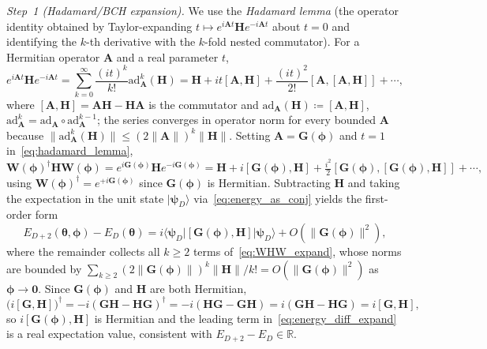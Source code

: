 \documentclass[11pt]{article}
\newcommand{\bbR}{\mathbb{R}}
\theoremstyle{plain}
\theoremstyle{plain}
\begin{document}
\emph{Step~1 (Hadamard/BCH expansion).}
We use the \emph{Hadamard lemma} (the operator identity obtained by
Taylor-expanding $t\mapsto e^{i\mathbf{A}t}\mathbf{H}e^{-i\mathbf{A}t}$ about $t=0$ and
identifying the $k$-th derivative with the $k$-fold nested commutator).
For a Hermitian operator $\mathbf{A}$ and a real parameter $t$,
\begin{equation}\label{eq:hadamard_lemma}
  e^{i\mathbf{A}t} \mathbf{H} e^{-i\mathbf{A}t}
  =\sum_{k=0}^{\infty}\frac{(it)^k}{k!} \mathrm{ad}_{\mathbf{A}}^{k}(\mathbf{H})
  =\mathbf{H}+it[\mathbf{A},\mathbf{H}]+\frac{(it)^2}{2!}[\mathbf{A},[\mathbf{A},\mathbf{H}]]+\cdots,
\end{equation}
where $[\mathbf{A},\mathbf{H}]=\mathbf{A}\mathbf{H}-\mathbf{H}\mathbf{A}$ is the commutator and
$\mathrm{ad}_{\mathbf{A}}(\mathbf{H})\coloneqq[\mathbf{A},\mathbf{H}]$,
$\mathrm{ad}_{\mathbf{A}}^{k}=\mathrm{ad}_{\mathbf{A}}\circ\mathrm{ad}_{\mathbf{A}}^{k-1}$;
the series converges in operator norm for every bounded $\mathbf{A}$ because
$\|\mathrm{ad}_{\mathbf{A}}^{k}(\mathbf{H})\|\le(2\|\mathbf{A}\|)^k\|\mathbf{H}\|$.  Setting
$\mathbf{A}=\mathbf{G}(\bm\phi)$ and $t=1$ in~\eqref{eq:hadamard_lemma},
\begin{equation}\label{eq:WHW_expand}
  \mathbf{W}(\bm\phi)^\dagger\mathbf{H} \mathbf{W}(\bm\phi)
  =e^{i\mathbf{G}(\bm\phi)} \mathbf{H} e^{-i\mathbf{G}(\bm\phi)}
  =\mathbf{H}+i[\mathbf{G}(\bm\phi),\mathbf{H}]
   +\tfrac{i^2}{2}[\mathbf{G}(\bm\phi),[\mathbf{G}(\bm\phi),\mathbf{H}]]+\cdots,
\end{equation}
using $\mathbf{W}(\bm\phi)^\dagger=e^{+i\mathbf{G}(\bm\phi)}$ since $\mathbf{G}(\bm\phi)$ is
Hermitian.  Subtracting $\mathbf{H}$ and taking the expectation in the unit
state $|\boldsymbol{\psi}_D\rangle$ via~\eqref{eq:energy_as_conj} yields the
first-order form
\begin{equation}\label{eq:energy_diff_expand}
  E_{D+2}(\bm\theta,\bm\phi)-E_D(\bm\theta)
  =i\langle\boldsymbol{\psi}_D|[\mathbf{G}(\bm\phi),\mathbf{H}]|\boldsymbol{\psi}_D\rangle
   +O(\|\mathbf{G}(\bm\phi)\|^2),
\end{equation}
where the remainder collects all $k\ge 2$ terms
of~\eqref{eq:WHW_expand}, whose norms are bounded by
$\sum_{k\ge2}(2\|\mathbf{G}(\bm\phi)\|)^k\|\mathbf{H}\|/k!=O(\|\mathbf{G}(\bm\phi)\|^2)$ as
$\bm\phi\to\bm0$.  Since $\mathbf{G}(\bm\phi)$ and $\mathbf{H}$ are both Hermitian,
\begin{equation}\label{eq:comm_hermitian}
  \bigl(i[\mathbf{G},\mathbf{H}]\bigr)^\dagger
  =-i (\mathbf{G}\mathbf{H}-\mathbf{H}\mathbf{G})^\dagger
  =-i (\mathbf{H}\mathbf{G}-\mathbf{G}\mathbf{H})
  =i (\mathbf{G}\mathbf{H}-\mathbf{H}\mathbf{G})
  =i[\mathbf{G},\mathbf{H}],
\end{equation}
so $i[\mathbf{G}(\bm\phi),\mathbf{H}]$ is Hermitian and the leading term
in~\eqref{eq:energy_diff_expand} is a real expectation value,
consistent with $E_{D+2}-E_D\in\bbR$.
\end{document}
